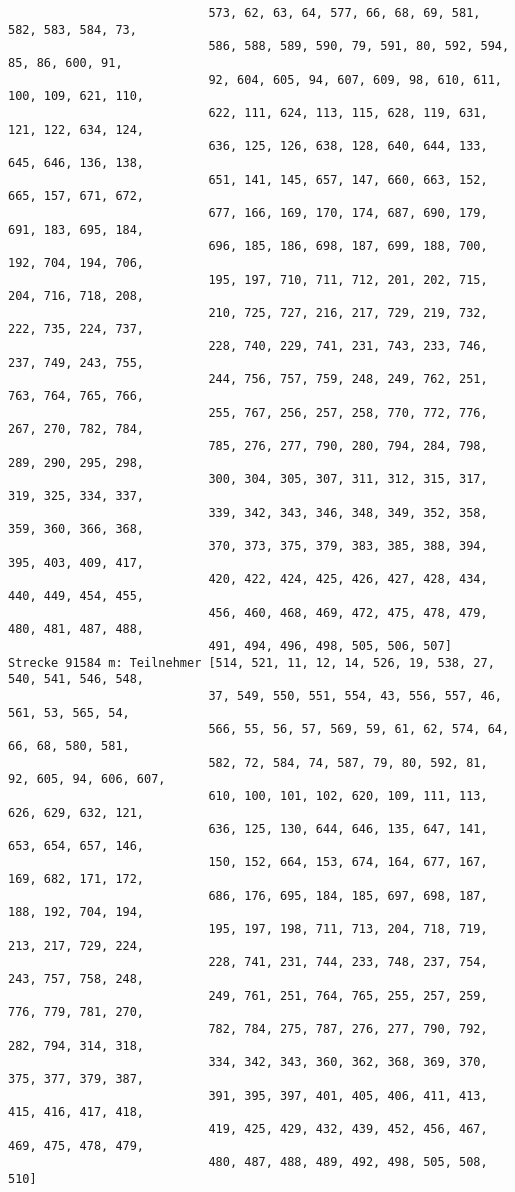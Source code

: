 \documentclass[a4paper,10pt,ngerman]{scrartcl}
\begin{document}
\begin{itemize}
\begin{verbatim}
                            573, 62, 63, 64, 577, 66, 68, 69, 581, 582, 583, 584, 73, 
                            586, 588, 589, 590, 79, 591, 80, 592, 594, 85, 86, 600, 91, 
                            92, 604, 605, 94, 607, 609, 98, 610, 611, 100, 109, 621, 110, 
                            622, 111, 624, 113, 115, 628, 119, 631, 121, 122, 634, 124, 
                            636, 125, 126, 638, 128, 640, 644, 133, 645, 646, 136, 138, 
                            651, 141, 145, 657, 147, 660, 663, 152, 665, 157, 671, 672, 
                            677, 166, 169, 170, 174, 687, 690, 179, 691, 183, 695, 184, 
                            696, 185, 186, 698, 187, 699, 188, 700, 192, 704, 194, 706, 
                            195, 197, 710, 711, 712, 201, 202, 715, 204, 716, 718, 208, 
                            210, 725, 727, 216, 217, 729, 219, 732, 222, 735, 224, 737, 
                            228, 740, 229, 741, 231, 743, 233, 746, 237, 749, 243, 755, 
                            244, 756, 757, 759, 248, 249, 762, 251, 763, 764, 765, 766, 
                            255, 767, 256, 257, 258, 770, 772, 776, 267, 270, 782, 784, 
                            785, 276, 277, 790, 280, 794, 284, 798, 289, 290, 295, 298, 
                            300, 304, 305, 307, 311, 312, 315, 317, 319, 325, 334, 337, 
                            339, 342, 343, 346, 348, 349, 352, 358, 359, 360, 366, 368, 
                            370, 373, 375, 379, 383, 385, 388, 394, 395, 403, 409, 417, 
                            420, 422, 424, 425, 426, 427, 428, 434, 440, 449, 454, 455, 
                            456, 460, 468, 469, 472, 475, 478, 479, 480, 481, 487, 488, 
                            491, 494, 496, 498, 505, 506, 507]
Strecke 91584 m: Teilnehmer [514, 521, 11, 12, 14, 526, 19, 538, 27, 540, 541, 546, 548, 
                            37, 549, 550, 551, 554, 43, 556, 557, 46, 561, 53, 565, 54, 
                            566, 55, 56, 57, 569, 59, 61, 62, 574, 64, 66, 68, 580, 581, 
                            582, 72, 584, 74, 587, 79, 80, 592, 81, 92, 605, 94, 606, 607, 
                            610, 100, 101, 102, 620, 109, 111, 113, 626, 629, 632, 121, 
                            636, 125, 130, 644, 646, 135, 647, 141, 653, 654, 657, 146, 
                            150, 152, 664, 153, 674, 164, 677, 167, 169, 682, 171, 172, 
                            686, 176, 695, 184, 185, 697, 698, 187, 188, 192, 704, 194, 
                            195, 197, 198, 711, 713, 204, 718, 719, 213, 217, 729, 224, 
                            228, 741, 231, 744, 233, 748, 237, 754, 243, 757, 758, 248, 
                            249, 761, 251, 764, 765, 255, 257, 259, 776, 779, 781, 270, 
                            782, 784, 275, 787, 276, 277, 790, 792, 282, 794, 314, 318, 
                            334, 342, 343, 360, 362, 368, 369, 370, 375, 377, 379, 387, 
                            391, 395, 397, 401, 405, 406, 411, 413, 415, 416, 417, 418, 
                            419, 425, 429, 432, 439, 452, 456, 467, 469, 475, 478, 479, 
                            480, 487, 488, 489, 492, 498, 505, 508, 510]
  \end{verbatim}
\end{itemize}
\end{document}
